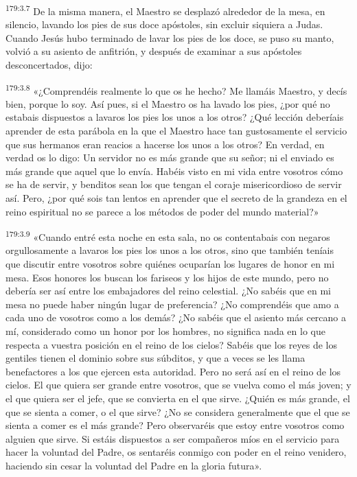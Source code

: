 \par 
\textsuperscript{179:3.7} De la misma manera, el Maestro se desplazó alrededor de la mesa, en silencio, lavando los pies de sus doce apóstoles, sin excluir siquiera a Judas. Cuando Jesús hubo terminado de lavar los pies de los doce, se puso su manto, volvió a su asiento de anfitrión, y después de examinar a sus apóstoles desconcertados, dijo:

\par 
\textsuperscript{179:3.8} «¿Comprendéis realmente lo que os he hecho? Me llamáis Maestro, y decís bien, porque lo soy. Así pues, si el Maestro os ha lavado los pies, ¿por qué no estabais dispuestos a lavaros los pies los unos a los otros? ¿Qué lección deberíais aprender de esta parábola en la que el Maestro hace tan gustosamente el servicio que sus hermanos eran reacios a hacerse los unos a los otros? En verdad, en verdad os lo digo: Un servidor no es más grande que su señor; ni el enviado es más grande que aquel que lo envía. Habéis visto en mi vida entre vosotros cómo se ha de servir, y benditos sean los que tengan el coraje misericordioso de servir así. Pero, ¿por qué sois tan lentos en aprender que el secreto de la grandeza en el reino espiritual no se parece a los métodos de poder del mundo material?»

\par 
\textsuperscript{179:3.9} «Cuando entré esta noche en esta sala, no os contentabais con negaros orgullosamente a lavaros los pies los unos a los otros, sino que también teníais que discutir entre vosotros sobre quiénes ocuparían los lugares de honor en mi mesa. Esos honores los buscan los fariseos y los hijos de este mundo, pero no debería ser así entre los embajadores del reino celestial. ¿No sabéis que en mi mesa no puede haber ningún lugar de preferencia? ¿No comprendéis que amo a cada uno de vosotros como a los demás? ¿No sabéis que el asiento más cercano a mí, considerado como un honor por los hombres, no significa nada en lo que respecta a vuestra posición en el reino de los cielos? Sabéis que los reyes de los gentiles tienen el dominio sobre sus súbditos, y que a veces se les llama benefactores a los que ejercen esta autoridad. Pero no será así en el reino de los cielos. El que quiera ser grande entre vosotros, que se vuelva como el más joven; y el que quiera ser el jefe, que se convierta en el que sirve. ¿Quién es más grande, el que se sienta a comer, o el que sirve? ¿No se considera generalmente que el que se sienta a comer es el más grande? Pero observaréis que estoy entre vosotros como alguien que sirve. Si estáis dispuestos a ser compañeros míos en el servicio para hacer la voluntad del Padre, os sentaréis conmigo con poder en el reino venidero, haciendo sin cesar la voluntad del Padre en la gloria futura».

